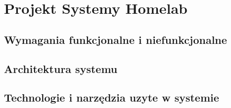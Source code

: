 \chapter{Projekt Systemy Homelab}

\section{Wymagania funkcjonalne i niefunkcjonalne}

\section{Architektura systemu}

\section{Technologie i narzędzia uzyte w systemie}